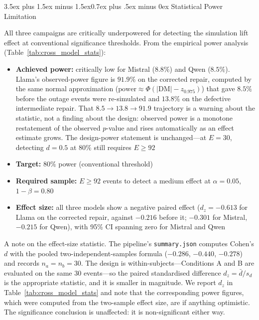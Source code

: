 \documentclass[11pt,journal,onecolumn]{IEEEtran}
\makeatletter
\renewcommand\subsection{\@startsection{subsection}{2}{\z@}%
  {3.5ex plus 1.5ex minus 1.5ex}{0.7ex plus .5ex minus 0ex}%
  {\normalfont\normalsize\bfseries}}
\makeatother
\begin{document}
\subsection{Statistical Power Limitation}
\label{sec:power_limitation}

All three campaigns are critically underpowered for detecting the simulation lift effect at conventional significance thresholds. From the empirical power analysis (Table~\ref{tab:cross_model_stats}):

\begin{itemize}
    \item \textbf{Achieved power:} critically low for Mistral ($8.8\%$) and Qwen ($8.5\%$). Llama's observed-power figure is $91.9\%$ on the corrected repair, computed by the same normal approximation ($\text{power} \approx \Phi(|\text{DM}| - z_{0.975})$) that gave $8.5\%$ before the outage events were re-simulated and $13.8\%$ on the defective intermediate repair. That $8.5 \to 13.8 \to 91.9$ trajectory is a warning about the statistic, not a finding about the design: observed power is a monotone restatement of the observed $p$-value and rises automatically as an effect estimate grows. The design-power statement is unchanged---at $E = 30$, detecting $d = 0.5$ at $80\%$ still requires $E \geq 92$
    \item \textbf{Target:} $80\%$ power (conventional threshold)
    \item \textbf{Required sample:} $E \geq 92$ events to detect a medium effect at $\alpha=0.05$, $1-\beta=0.80$
    \item \textbf{Effect size:} all three models show a negative paired effect ($d_z = -0.613$ for Llama on the corrected repair, against $-0.216$ before it; $-0.301$ for Mistral, $-0.215$ for Qwen), with 95\% CI spanning zero for Mistral and Qwen
\end{itemize}

A note on the effect-size statistic. The pipeline's \texttt{summary.json} computes Cohen's $d$ with the pooled two-independent-samples formula ($-0.286$, $-0.440$, $-0.278$) and records $n_a = n_b = 30$. The design is within-subjects---Conditions A and B are evaluated on the same 30 events---so the paired standardised difference $d_z = \bar{d}/s_d$ is the appropriate statistic, and it is smaller in magnitude. We report $d_z$ in Table~\ref{tab:cross_model_stats} and note that the corresponding power figures, which were computed from the two-sample effect size, are if anything optimistic. The significance conclusion is unaffected: it is non-significant either way.
\end{document}
